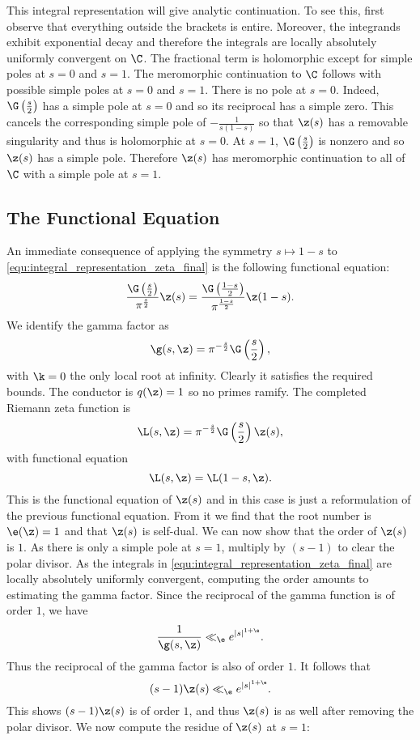      This integral representation will give analytic continuation. To see this, first observe that everything outside the brackets is entire. Moreover, the integrands exhibit exponential decay and therefore the integrals are locally absolutely uniformly convergent on $\C$. The fractional term is holomorphic except for simple poles at $s = 0$ and $s = 1$. The meromorphic continuation to $\C$ follows with possible simple poles at $s = 0$ and $s = 1$. There is no pole at $s = 0$. Indeed, $\G\left(\frac{s}{2}\right)$ has a simple pole at $s = 0$ and so its reciprocal has a simple zero. This cancels the corresponding simple pole of $-\frac{1}{s(1-s)}$ so that $\z(s)$ has a removable singularity and thus is holomorphic at $s = 0$. At $s = 1$, $\G\left(\frac{s}{2}\right)$ is nonzero and so $\z(s)$ has a simple pole. Therefore $\z(s)$ has meromorphic continuation to all of $\C$ with a simple pole at $s = 1$.
    \subsection*{The Functional Equation}
      An immediate consequence of applying the symmetry $s \mapsto 1-s$ to \cref{equ:integral_representation_zeta_final} is the following functional equation:
      \[
        \frac{\G\left(\frac{s}{2}\right)}{\pi^{\frac{s}{2}}}\z(s) = \frac{\G\left(\frac{1-s}{2}\right)}{\pi^{\frac{1-s}{2}}}\z(1-s).
      \]
      We identify the gamma factor as
      \[
        \g(s,\z) = \pi^{-\frac{s}{2}}\G\left(\frac{s}{2}\right),
      \]
      with $\k = 0$ the only local root at infinity. Clearly it satisfies the required bounds. The conductor is $q(\z) = 1$ so no primes ramify. The completed Riemann zeta function is
      \[
        \L(s,\z) = \pi^{-\frac{s}{2}}\G\left(\frac{s}{2}\right)\z(s),
      \]
      with functional equation
      \[
        \L(s,\z) = \L(1-s,\z).
      \]
      This is the functional equation of $\z(s)$ and in this case is just a reformulation of the previous functional equation. From it we find that the root number is $\e(\z) = 1$ and that $\z(s)$ is self-dual. We can now show that the order of $\z(s)$ is $1$. As there is only a simple pole at $s = 1$, multiply by $(s-1)$ to clear the polar divisor. As the integrals in \cref{equ:integral_representation_zeta_final} are locally absolutely uniformly convergent, computing the order amounts to estimating the gamma factor. Since the reciprocal of the gamma function is of order $1$, we have
      \[
        \frac{1}{\g(s,\z)} \ll_{\e} e^{|s|^{1+\e}}.
      \]
      Thus the reciprocal of the gamma factor is also of order $1$. It follows that
      \[
        (s-1)\z(s) \ll_{\e} e^{|s|^{1+\e}}.
      \]
      This shows $(s-1)\z(s)$ is of order $1$, and thus $\z(s)$ is as well after removing the polar divisor. We now compute the residue of $\z(s)$ at $s = 1$:

